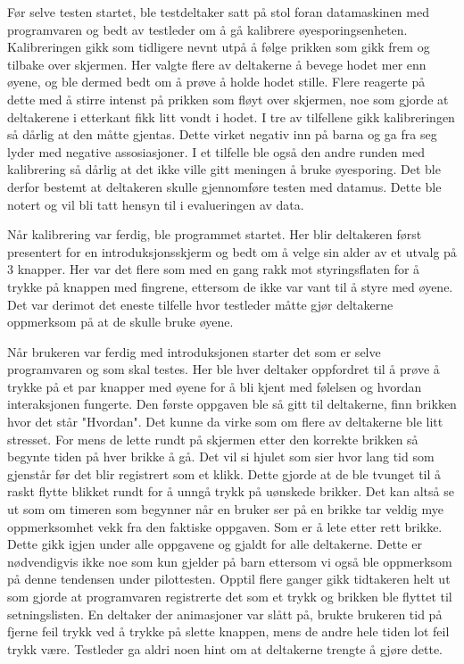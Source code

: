 Før selve testen startet, ble testdeltaker satt på stol foran datamaskinen med programvaren og bedt av testleder om å gå kalibrere øyesporingsenheten. Kalibreringen gikk som tidligere nevnt utpå å følge prikken som gikk frem og tilbake over skjermen. Her valgte flere av deltakerne å bevege hodet mer enn øyene, og ble dermed bedt om å prøve å holde hodet stille. Flere reagerte på dette med å stirre intenst på prikken som fløyt over skjermen, noe som gjorde at deltakerene i etterkant fikk litt vondt i hodet. I tre av tilfellene gikk kalibreringen så dårlig at den måtte gjentas. Dette virket negativ inn på barna og ga fra seg lyder med negative assosiasjoner. I et tilfelle ble også den andre runden med kalibrering så dårlig at det ikke ville gitt meningen å bruke øyesporing. Det ble derfor bestemt at deltakeren skulle gjennomføre testen med datamus. Dette ble notert og vil bli tatt hensyn til i evalueringen av data.

Når kalibrering var ferdig, ble programmet startet. Her blir deltakeren først presentert for en introduksjonsskjerm og  bedt om å velge sin alder av et utvalg på 3 knapper. Her var det flere som med en gang rakk mot styringsflaten for å trykke på knappen med fingrene, ettersom de ikke var vant til å styre med øyene. Det var derimot det eneste tilfelle hvor testleder måtte gjør deltakerne oppmerksom på at de skulle bruke øyene.

Når brukeren var ferdig med introduksjonen starter det som er selve programvaren og som skal testes. Her ble hver deltaker oppfordret til  å prøve å trykke på et par knapper med øyene for å bli kjent med følelsen og hvordan interaksjonen fungerte. Den første oppgaven ble så gitt til deltakerne, finn brikken hvor det står "Hvordan". Det kunne da virke som om flere av deltakerne ble litt stresset. For mens de lette rundt på skjermen etter den korrekte brikken så begynte tiden på hver brikke å gå. Det vil si hjulet som sier hvor lang tid som gjenstår før det blir registrert som et klikk. Dette gjorde at de ble tvunget til å raskt flytte blikket rundt for å unngå trykk på uønskede brikker. Det kan altså se ut som om timeren som begynner når en bruker ser på en brikke tar veldig mye oppmerksomhet vekk fra den faktiske oppgaven. Som er å lete etter rett brikke. Dette gikk igjen under alle oppgavene og gjaldt for alle deltakerne. Dette er nødvendigvis ikke noe som kun gjelder på barn ettersom vi også ble oppmerksom på denne tendensen under pilottesten. Opptil flere ganger gikk tidtakeren helt ut som gjorde at programvaren registrerte det som et trykk og brikken ble flyttet til setningslisten. En deltaker  der animasjoner var slått på, brukte brukeren tid på fjerne feil trykk ved å trykke på slette knappen, mens de andre hele tiden lot feil trykk være. Testleder ga aldri noen hint om at deltakerne trengte å gjøre dette. 

